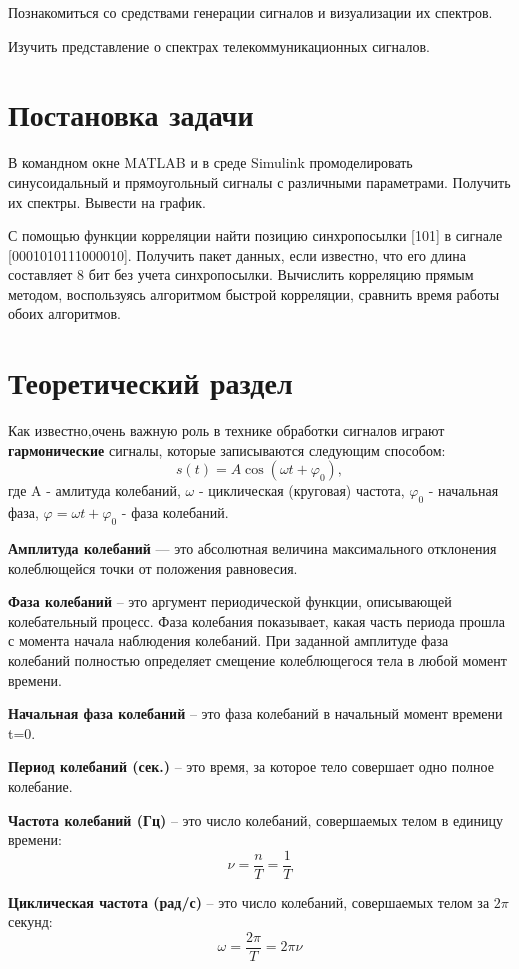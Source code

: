 \documentclass[12pt,a4paper]{scrartcl}
\begin{document}
Познакомиться со средствами генерации сигналов и визуализации их спектров.

Изучить представление о спектрах телекоммуникационных сигналов.

\section{Постановка задачи}
\label{sec:task}

В командном окне MATLAB и в среде Simulink промоделировать синусоидальный и прямоугольный сигналы с различными параметрами. Получить их спектры. Вывести на график.

С помощью функции корреляции найти позицию синхропосылки [101] в сигнале [0001010111000010]. Получить пакет данных, если известно, что его длина составляет 8 бит без учета синхропосылки. Вычислить корреляцию прямым методом, воспользуясь алгоритмом быстрой корреляции, сравнить время работы обоих алгоритмов.

\section{Теоретический раздел}
\label{sec:teoriya}
Как известно,очень важную роль в технике обработки сигналов играют \textbf{гармонические} сигналы, которые записываются следующим способом:
$$s(t)=A\cos (\omega t+\varphi _0),$$ где  A - амлитуда колебаний, $\omega$ - циклическая (круговая) частота, $\varphi _0$ - начальная фаза, $\varphi = \omega t+\varphi _0$ - фаза колебаний.

\textbf{Амплитуда колебаний} — это абсолютная величина максимального отклонения колеблющейся точки от положения равновесия.

\textbf{Фаза колебаний} – это аргумент периодической функции, описывающей колебательный процесс. Фаза колебания показывает, какая часть периода прошла с момента начала наблюдения колебаний. При заданной амплитуде фаза колебаний полностью определяет смещение колеблющегося тела в любой момент времени.

\textbf{Начальная фаза колебаний} – это фаза колебаний в начальный момент времени t=0. 

\textbf{Период колебаний (сек.)} – это время, за которое тело совершает одно полное колебание. 

\textbf{Частота колебаний (Гц)} – это число колебаний, совершаемых телом в единицу времени:
$$ \nu = \frac{n}{T} = \frac{1}{T}$$

\textbf{Циклическая частота (рад/с)} – это число колебаний, совершаемых телом за $2\pi$ секунд: 
$$\omega = \frac{2\pi}{T} = 2\pi \nu$$
\end{document}
